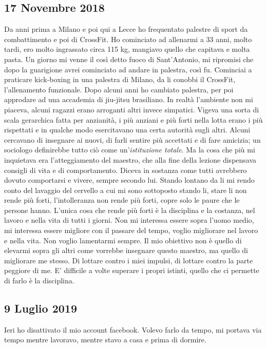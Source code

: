 \subsection{17 Novembre 2018}
Da anni prima a Milano e poi qui a Lecce ho frequentato palestre di sport da combattimento e poi di CrossFit. Ho cominciato ad allenarmi a 33 anni, molto tardi, ero molto ingrassato circa 115 kg, mangiavo quello che capitava e molta pasta. Un giorno mi venne il così detto fuoco di Sant'Antonio, mi ripromisi che dopo la guarigione avrei cominciato ad andare in palestra, così fu. Cominciai a praticare kick-boxing in una palestra di Milano, da li conobbi il CrossFit, l'allenamento funzionale. Dopo alcuni anni ho cambiato palestra, per poi approdare ad una accademia di jiu-jitsu brasiliano.
In realtà l'ambiente non mi piaceva, alcuni ragazzi erano arroganti altri invece simpatici. Vigeva una sorta di scala gerarchica fatta per anzianità, i più anziani e più forti nella lotta erano i più rispettati e in qualche modo esercitavano una certa autorità sugli altri. Alcuni cercavano di insegnare ai nuovi, di farli sentire più accettati e di fare amicizia; un sociologo definirebbe tutto ciò come un'\emph{istituzione totale}.\newline
Ma la cosa che più mi inquietava era l'atteggiamento del maestro, che alla fine della lezione dispensava consigli di vita e di comportamento. Diceva in sostanza come tutti avrebbero dovuto comportarsi e vivere, sempre secondo lui. Stando lontano da li mi rendo conto del lavaggio del cervello a cui mi sono sottoposto stando li, stare li non rende  più forti, l'intolleranza non rende più forti, copre solo le paure che le persone hanno. L'unica cosa che rende più forti è la disciplina e la costanza, nel lavoro e nella vita di tutti i giorni.\newline
Non mi interessa essere sopra l'uomo medio, mi interessa essere migliore con il passare del tempo, voglio migliorare nel lavoro e nella vita. Non voglio lamentarmi sempre.\newline
Il mio obiettivo non è quello di elevarmi sopra gli altri come vorrebbe insegnare questo maestro, ma quello di migliorare me stesso. Di lottare contro i miei impulsi, di lottare contro la parte peggiore di me.
E' difficile a volte superare i propri istinti, quello che ci permette di farlo è la disciplina.
\subsection{9 Luglio 2019}
Ieri ho disattivato il mio account facebook. Volevo farlo da tempo, mi portava via tempo mentre lavoravo, mentre stavo a casa e prima di dormire.